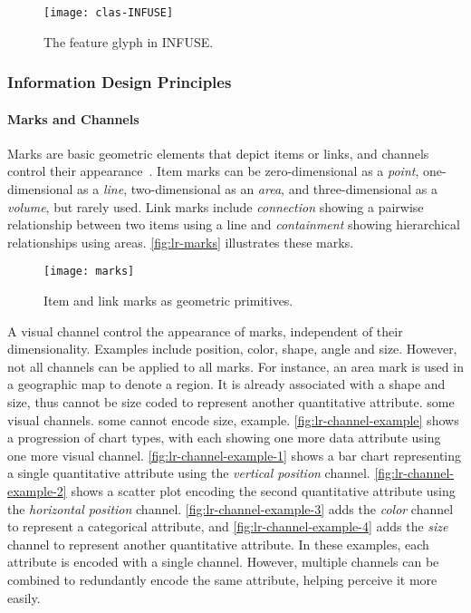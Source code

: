 \begin{figure}[!htb]
	\centering
	\texttt{[image: clas-INFUSE]}
	\caption{The feature glyph in INFUSE. }
	\label{fig:lr-INFUSE}
\end{figure}

\subsubsection{Information Design Principles}
\label{sub:lr-design}

\paragraph{Marks and Channels}
Marks are basic geometric elements that depict items or links, and channels control their appearance~\cite{Munzner2014}. Item marks can be zero-dimensional as a \emph{point}, one-dimensional as a \emph{line}, two-dimensional as an \emph{area}, and three-dimensional as a \emph{volume}, but rarely used. Link marks include \emph{connection} showing a pairwise relationship between two items using a line and \emph{containment} showing hierarchical relationships using areas. \autoref{fig:lr-marks} illustrates these marks. 

\begin{figure}[!htb]
	\centering
	\texttt{[image: marks]}
	\caption{Item and link marks as geometric primitives. }
	\label{fig:lr-marks}
\end{figure}

A visual channel control the appearance of marks, independent of their dimensionality. Examples include position, color, shape, angle and size. However, not all channels can be applied to all marks. For instance, an area mark is used in a geographic map to denote a region. It is already associated with a shape and size, thus cannot be size coded to represent another quantitative attribute.
some visual channels. some cannot encode size, example. \autoref{fig:lr-channel-example} shows a progression of chart types, with each showing one more data attribute using one more visual channel. \autoref{fig:lr-channel-example-1} shows a bar chart representing a single quantitative attribute using the \emph{vertical position} channel. \autoref{fig:lr-channel-example-2} shows a scatter plot encoding the second quantitative attribute using the \emph{horizontal position} channel. \autoref{fig:lr-channel-example-3} adds the \emph{color} channel to represent a categorical attribute, and \autoref{fig:lr-channel-example-4} adds the \emph{size} channel to represent another quantitative attribute. In these examples, each attribute is encoded with a single channel. However, multiple channels can be combined to redundantly encode the same attribute, helping perceive it more easily.


